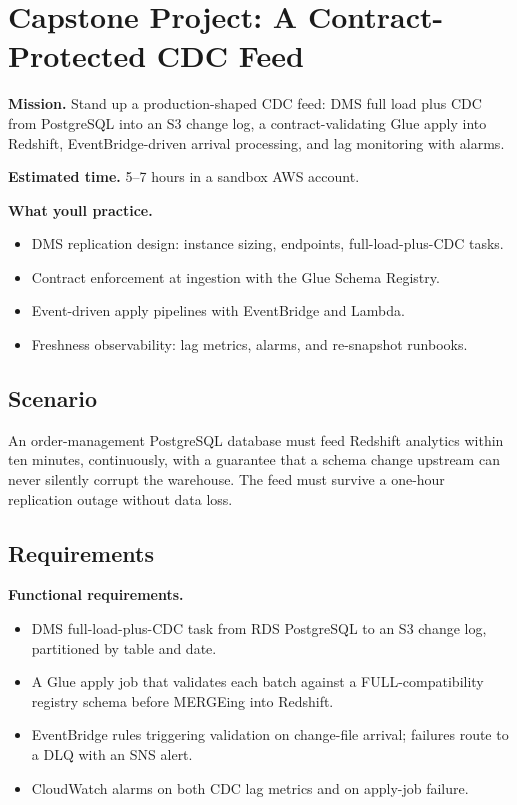 \section{Capstone Project: A Contract-Protected CDC Feed}\label{sec:ch11-capstone}

\begin{capstonebox}
\textbf{Mission.} Stand up a production-shaped CDC feed: DMS full load plus CDC from PostgreSQL into an S3 change log, a contract-validating Glue apply into Redshift, EventBridge-driven arrival processing, and lag monitoring with alarms.

\textbf{Estimated time.} 5--7 hours in a sandbox AWS account.

\textbf{What you\textquotesingle{}ll practice.}
\begin{itemize}
    \item DMS replication design: instance sizing, endpoints, full-load-plus-CDC tasks.
    \item Contract enforcement at ingestion with the Glue Schema Registry.
    \item Event-driven apply pipelines with EventBridge and Lambda.
    \item Freshness observability: lag metrics, alarms, and re-snapshot runbooks.
\end{itemize}
\end{capstonebox}

\subsection*{Scenario}
An order-management PostgreSQL database must feed Redshift analytics within ten minutes, continuously, with a guarantee that a schema change upstream can never silently corrupt the warehouse. The feed must survive a one-hour replication outage without data loss.

\subsection*{Requirements}
\textbf{Functional requirements.}
\begin{itemize}
    \item DMS full-load-plus-CDC task from RDS PostgreSQL to an S3 change log, partitioned by table and date.
    \item A Glue apply job that validates each batch against a FULL-compatibility registry schema before MERGEing into Redshift.
    \item EventBridge rules triggering validation on change-file arrival; failures route to a DLQ with an SNS alert.
    \item CloudWatch alarms on both CDC lag metrics and on apply-job failure.
\end{itemize}

